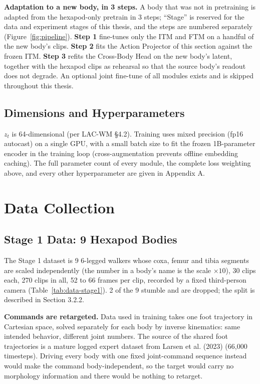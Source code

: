 \documentclass[12pt,a4paper,oneside]{report}
\begin{document}
\noindent\textbf{Adaptation to a new body, in 3 steps.} A body that was not in pretraining is adapted from the
hexapod-only pretrain in 3 steps; ``Stage'' is reserved for the data and experiment stages of this thesis, and the
steps are numbered separately (Figure~\ref{fig:pipeline}). \textbf{Step 1} fine-tunes only the ITM and FTM on a handful of
the new body's clips. \textbf{Step 2} fits the Action Projector of this section against the frozen ITM. \textbf{Step 3}
refits the Cross-Body Head on the new body's latent, together with the hexapod clips as rehearsal so that the source
body's readout does not degrade. An optional joint fine-tune of all modules exists and is skipped throughout this
thesis.

\subsection{Dimensions and Hyperparameters}
$z_t$ is 64-dimensional (per LAC-WM \S4.2). Training uses mixed precision (fp16 autocast) on a single GPU, with a
small batch size to fit the frozen 1B-parameter encoder in the training loop (cross-augmentation prevents offline
embedding caching). The full parameter count of every module, the complete loss weighting above, and every other
hyperparameter are given in Appendix A.

\section{Data Collection}

\subsection{Stage 1 Data: 9 Hexapod Bodies}
The Stage 1 dataset is 9 6-legged walkers whose coxa, femur and tibia segments are scaled
independently (the number in a body's name is the scale $\times 10$), 30 clips each, 270 clips in all, 52 to 66
frames per clip, recorded by a fixed third-person camera (Table~\ref{tab:data-stage1}). 2 of the 9 stumble and
are dropped; the split is described in Section 3.2.2.

\textbf{Commands are retargeted.} Data used in training takes one foot trajectory in Cartesian space, solved separately
for each body by inverse kinematics: same intended behavior, different joint numbers. The source of the
shared foot trajectories is a mature logged expert dataset from Larsen et al. (2023)
(66{,}000 timesteps). Driving every body with one fixed joint-command sequence
instead would make the command body-independent, so the target would carry no morphology information and there would
be nothing to retarget.
\end{document}
